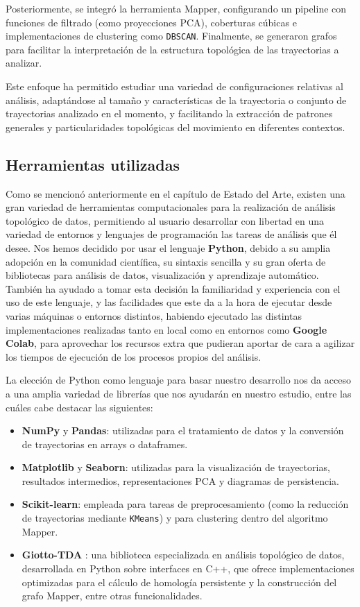 Posteriormente, se integró la herramienta Mapper, configurando un pipeline con funciones de filtrado (como proyecciones PCA), coberturas cúbicas e implementaciones de clustering como \texttt{DBSCAN}. Finalmente, se generaron grafos para facilitar la interpretación de la estructura topológica de las trayectorias a analizar.

Este enfoque ha permitido estudiar una variedad de configuraciones relativas al análisis, adaptándose al tamaño y características de la trayectoria o conjunto de trayectorias analizado en el momento, y facilitando la extracción de patrones generales y particularidades topológicas del movimiento en diferentes contextos.

\subsection{Herramientas utilizadas}

Como se mencionó anteriormente en el capítulo de Estado del Arte, existen una gran variedad de herramientas computacionales para la realización de análisis topológico de datos, permitiendo al usuario desarrollar con libertad en una variedad de entornos y lenguajes de programación las tareas de análisis que él desee. Nos hemos decidido por usar el lenguaje \textbf{Python}, debido a su amplia adopción en la comunidad científica, su sintaxis sencilla  y su gran oferta de bibliotecas para análisis de datos, visualización y aprendizaje automático. También ha ayudado a tomar esta decisión la familiaridad y experiencia con el uso de este lenguaje, y las facilidades que este da a la hora de ejecutar desde varias máquinas o entornos distintos, habiendo ejecutado las distintas implementaciones realizadas tanto en local como en entornos como \textbf{Google Colab}, para aprovechar los recursos extra que pudieran aportar de cara a agilizar los tiempos de ejecución de los procesos propios del análisis. 


La elección de Python como lenguaje para basar nuestro desarrollo nos da acceso a una amplia variedad de librerías que nos ayudarán en nuestro estudio, entre las cuáles cabe destacar las siguientes:

\begin{itemize}
    \item \textbf{NumPy} y \textbf{Pandas}: utilizadas para el tratamiento de datos y la conversión de trayectorias en arrays o dataframes.
    \item \textbf{Matplotlib} y \textbf{Seaborn}: utilizadas para la visualización de trayectorias, resultados intermedios, representaciones PCA y diagramas de persistencia.
    \item \textbf{Scikit-learn}: empleada para tareas de preprocesamiento (como la reducción de trayectorias mediante \texttt{KMeans}) y para clustering dentro del algoritmo Mapper.
    \item \textbf{Giotto-TDA} \cite{Giotto-tda}: una biblioteca especializada en análisis topológico de datos, desarrollada en Python sobre interfaces en C++, que ofrece implementaciones optimizadas para el cálculo de homología persistente y la construcción del grafo Mapper, entre otras funcionalidades.
\end{itemize}

